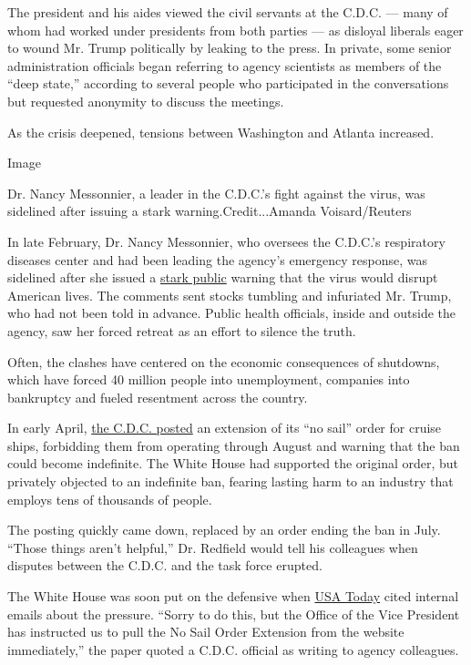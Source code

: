 The president and his aides viewed the civil servants at the C.D.C. ---
many of whom had worked under presidents from both parties --- as
disloyal liberals eager to wound Mr. Trump politically by leaking to the
press. In private, some senior administration officials began referring
to agency scientists as members of the ``deep state,'' according to
several people who participated in the conversations but requested
anonymity to discuss the meetings.

As the crisis deepened, tensions between Washington and Atlanta
increased.

Image

Dr. Nancy Messonnier, a leader in the C.D.C.'s fight against the virus,
was sidelined after issuing a stark warning.Credit...Amanda
Voisard/Reuters

In late February, Dr. Nancy Messonnier, who oversees the C.D.C.'s
respiratory diseases center and had been leading the agency's emergency
response, was sidelined after she issued a
\href{https://www.cdc.gov/media/releases/2020/t0225-cdc-telebriefing-covid-19.html}{stark
public} warning that the virus would disrupt American lives. The
comments sent stocks tumbling and infuriated Mr. Trump, who had not been
told in advance. Public health officials, inside and outside the agency,
saw her forced retreat as an effort to silence the truth.

Often, the clashes have centered on the economic consequences of
shutdowns, which have forced 40 million people into unemployment,
companies into bankruptcy and fueled resentment across the country.

In early April,
\href{https://web.archive.org/web/20200409221838/https://www.cdc.gov/quarantine/cruise/index.html}{the
C.D.C. posted} an extension of its ``no sail'' order for cruise ships,
forbidding them from operating through August and warning that the ban
could become indefinite. The White House had supported the original
order, but privately objected to an indefinite ban, fearing lasting harm
to an industry that employs tens of thousands of people.

The posting quickly came down, replaced by an order ending the ban in
July. ``Those things aren't helpful,'' Dr. Redfield would tell his
colleagues when disputes between the C.D.C. and the task force erupted.

The White House was soon put on the defensive when
\href{https://www.usatoday.com/story/travel/cruises/2020/04/13/coronavirus-cruise-ships-saw-red-flags-amid-chaotic-federal-response/2937001001/}{USA
Today} cited internal emails about the pressure. ``Sorry to do this, but
the Office of the Vice President has instructed us to pull the No Sail
Order Extension from the website immediately,'' the paper quoted a
C.D.C. official as writing to agency colleagues.


